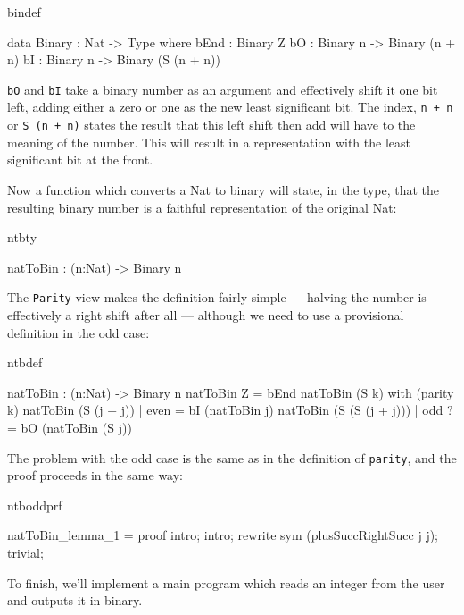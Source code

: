 \begin{SaveVerbatim}{bindef}

data Binary : Nat -> Type where
   bEnd : Binary Z
   bO : Binary n -> Binary (n + n)
   bI : Binary n -> Binary (S (n + n))

\end{SaveVerbatim}

\noindent
\texttt{bO} and \texttt{bI} take a binary number as an argument and effectively shift it one bit
left, adding either a zero or one as the new least significant bit. The index,
\texttt{n + n} or \texttt{S (n + n)} states the result that this left shift then add will
have to the meaning of the number. This will result in a representation with
the least significant bit at the front.

Now a function which converts a Nat to binary will state, in the type, that the
resulting binary number is a faithful representation of the original Nat:

\begin{SaveVerbatim}{ntbty}

natToBin : (n:Nat) -> Binary n

\end{SaveVerbatim}

\noindent
The \texttt{Parity} view makes the definition fairly simple --- halving the
number is effectively a right shift after all --- although we need to use a
provisional definition in the odd case:

\begin{SaveVerbatim}{ntbdef}

natToBin : (n:Nat) -> Binary n
natToBin Z = bEnd
natToBin (S k) with (parity k)
   natToBin (S (j + j))     | even  = bI (natToBin j)
   natToBin (S (S (j + j))) | odd  ?= bO (natToBin (S j))

\end{SaveVerbatim}

\noindent
The problem with the odd case is the same as in the definition of \texttt{parity}, and
the proof proceeds in the same way:

\begin{SaveVerbatim}{ntboddprf}

natToBin_lemma_1 = proof {
    intro;
    intro;
    rewrite sym (plusSuccRightSucc j j);
    trivial;
}

\end{SaveVerbatim}

\noindent
To finish, we'll implement a main program which reads an integer from the user and
outputs it in binary. 

